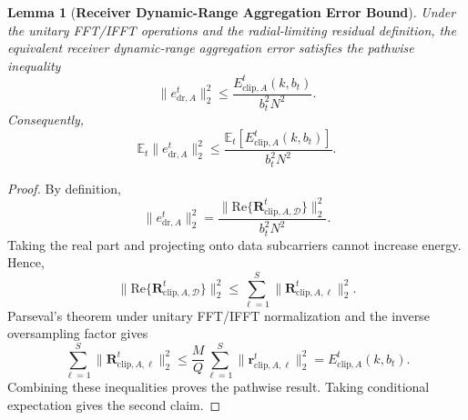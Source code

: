 \documentclass[journal]{IEEEtran}
\newtheorem{lemma}{Lemma}
\begin{document}
\begin{lemma}[\bf Receiver Dynamic-Range Aggregation Error Bound]
    \label{lemma:dr_error}
    Under the unitary FFT/IFFT operations and the radial-limiting residual definition, the equivalent receiver dynamic-range aggregation error satisfies the pathwise inequality
    \begin{equation}
        \|e_{\mathrm{dr},A}^t\|_2^2
        \le
        \frac{E_{\mathrm{clip},A}^t(k,b_t)}{b_t^2N^2}.
    \end{equation}
    Consequently,
    \begin{equation}
        \mathbb{E}_t\|e_{\mathrm{dr},A}^t\|_2^2
        \le
        \frac{\mathbb{E}_t[E_{\mathrm{clip},A}^t(k,b_t)]}{b_t^2N^2}.
    \end{equation}
\end{lemma}
\begin{proof}
    By definition,
    \begin{equation}
        \|e_{\mathrm{dr},A}^t\|_2^2
        =\frac{\|\mathrm{Re}\{\mathbf{R}_{\mathrm{clip},A,\mathcal{D}}^t\}\|_2^2}{b_t^2N^2}.
    \end{equation}
    Taking the real part and projecting onto data subcarriers cannot increase energy. Hence,
    \begin{equation}
        \|\mathrm{Re}\{\mathbf{R}_{\mathrm{clip},A,\mathcal{D}}^t\}\|_2^2
        \le
        \sum_{\ell=1}^{S}\|\mathbf{R}_{\mathrm{clip},A,\ell}^t\|_2^2.
    \end{equation}
    Parseval's theorem under unitary FFT/IFFT normalization and the inverse oversampling factor gives
    \begin{equation}
        \sum_{\ell=1}^{S}\|\mathbf{R}_{\mathrm{clip},A,\ell}^t\|_2^2
        \le\frac{M}{Q}\sum_{\ell=1}^{S}\|\mathbf{r}_{\mathrm{clip},A,\ell}^t\|_2^2
        =E_{\mathrm{clip},A}^t(k,b_t).
    \end{equation}
    Combining these inequalities proves the pathwise result. Taking conditional expectation gives the second claim.
\end{proof}
\end{document}
